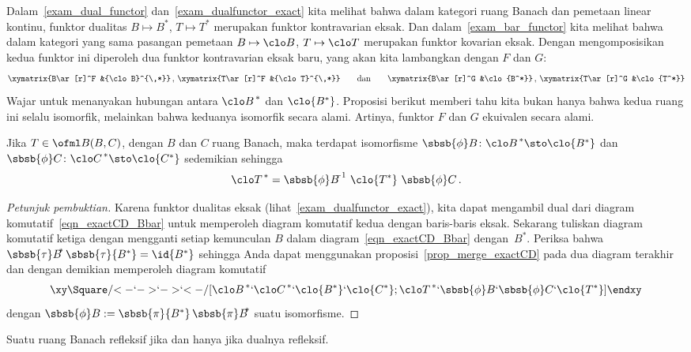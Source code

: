 Dalam~\ref{exam_dual_functor} dan~\ref{exam_dualfunctor_exact} kita melihat bahwa dalam kategori ruang Banach
dan pemetaan linear kontinu, funktor dualitas $B \mapsto B^*$, $T \mapsto T^*$ merupakan funktor kontravarian eksak.
Dan dalam~\ref{exam_bar_functor} kita melihat bahwa dalam kategori yang sama pasangan pemetaan $B \mapsto \clo B$,
$T \mapsto \clo T$ merupakan funktor kovarian eksak. Dengan mengomposisikan kedua funktor ini diperoleh dua funktor
kontravarian eksak baru, yang akan kita lambangkan dengan $F$ dan $G$:
  \[ \xymatrix{B\ar[r]^F &{\clo B}^{\,*}}\,,\,\xymatrix{T\ar[r]^F &{\clo T}^{\,*}} \qquad \text{dan} \qquad
           \xymatrix{B\ar[r]^G &\clo{B^*}}\,,\,\xymatrix{T\ar[r]^G &\clo{T^*}}  \]
Wajar untuk menanyakan hubungan antara ${\clo B}^{\,*}$ dan $\clo{B^*}$. Proposisi berikut
memberi tahu kita bukan hanya bahwa kedua ruang ini selalu isomorfik, melainkan bahwa keduanya isomorfik secara alami. Artinya,
funktor $F$ dan $G$ ekuivalen secara alami.

\begin{prop} Jika $T \in \ofml B(B,C)$, dengan $B$ dan $C$ ruang Banach, maka terdapat isomorfisme
$\sbsb{\phi}B \colon {\clo B}^{\,*} \sto \clo{B^*}$ dan $\sbsb{\phi}C \colon {\clo C}^{\,*} \sto \clo{C^*}$ sedemikian sehingga
   \[ {\clo T}^{\,*} = {\sbsb{\phi}B}^{\!\!\!-1}\,\, \clo{T^*}\,\,\sbsb{\phi}C\,. \]
\end{prop}

\begin{proof}[\emph{Petunjuk pembuktian}] Karena funktor dualitas eksak (lihat~\ref{exam_dualfunctor_exact}), kita dapat
mengambil dual dari diagram komutatif~\eqref{eqn_exactCD_Bbar} untuk memperoleh diagram komutatif kedua dengan baris-baris
eksak. Sekarang tuliskan diagram komutatif ketiga dengan mengganti setiap kemunculan $B$ dalam diagram~\eqref{eqn_exactCD_Bbar}
dengan~$B^*$. Periksa bahwa ${\sbsb{\tau}B}^{\!\!*}\,\sbsb{\tau}{B^*} = \id{B^*}$ sehingga Anda dapat menggunakan proposisi~\ref{prop_merge_exactCD}
pada dua diagram terakhir dan dengan demikian memperoleh diagram komutatif
     \[ \xy
          \Square/{<-}`{->}`{->}`{<-}/[{\clo B}^{\,*}`{\clo C}^{\,*}`\clo{B^*}`\clo{C^*};{\clo T}^{\,*}`\sbsb{\phi}B`\sbsb{\phi}C`\clo{T^*}]
      \endxy \]
dengan $\sbsb{\phi}B := \sbsb{\pi}{B^*}\,{\sbsb{\pi}B}^{\!\!*}$ suatu isomorfisme.   \ns
\end{proof}

\begin{cor} Suatu ruang Banach refleksif jika dan hanya jika dualnya refleksif.
\end{cor}

